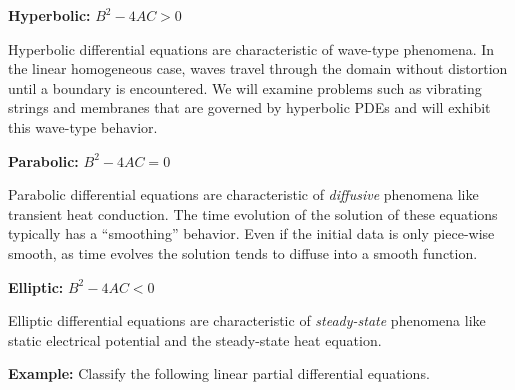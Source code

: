 \vspace{0.5cm}

\noindent\textbf{Hyperbolic:} $B^2 - 4AC > 0$ 

Hyperbolic differential equations are characteristic of wave-type phenomena.  In the linear homogeneous case, waves travel through the domain without distortion until a boundary is encountered.  We will examine problems such as vibrating strings and membranes that are governed by hyperbolic PDEs and will exhibit this wave-type behavior.

\vspace{0.5cm}

\noindent\textbf{Parabolic:} $B^2-4AC = 0$

Parabolic differential equations are characteristic of \emph{diffusive} phenomena like transient heat conduction.  The time evolution of the solution of these equations typically has a ``smoothing'' behavior.  Even if the initial data is only piece-wise smooth, as time evolves the solution tends to diffuse into a smooth function.  

\vspace{0.5cm}

\noindent\textbf{Elliptic:} $B^2-4AC < 0$

Elliptic differential equations are characteristic of \emph{steady-state} phenomena like static electrical potential and the steady-state heat equation.

\vspace{0.5cm}

\noindent\textbf{Example:}  Classify the following linear partial differential equations.

